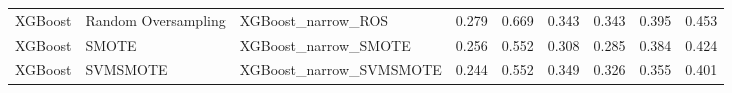 \begin{tabular}{lllllllll}
                     XGBoost & Random Oversampling &                           XGBoost\_narrow\_ROS & 0.279 &                     0.669 &                 0.343 &                  0.343 &                                   0.395 &    0.453 \\
                     XGBoost &               SMOTE &                         XGBoost\_narrow\_SMOTE & 0.256 &                     0.552 &                 0.308 &                  0.285 &                                   0.384 &    0.424 \\
                     XGBoost &            SVMSMOTE &                      XGBoost\_narrow\_SVMSMOTE & 0.244 &                     0.552 &                 0.349 &                  0.326 &                                   0.355 &    0.401 \\
\bottomrule
\end{tabular}
